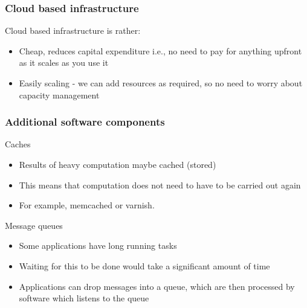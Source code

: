 \documentclass[a4paper]{article}
\theoremstyle{plain}
\theoremstyle{definition}
\theoremstyle{remark}
\begin{document}
\begin{flushleft}
\subsubsection{Cloud based infrastructure}
Cloud based infrastructure is rather:
\begin{itemize}
	\item Cheap, reduces capital expenditure i.e., no need to pay for anything upfront as it scales as you use it
	\item Easily scaling - we can add resources as required, so no need to worry about capacity management
\end{itemize}
\subsubsection{Additional software components}
Caches
\begin{itemize}
	\item Results of heavy computation maybe cached (stored)
	\item This means that computation does not need to have to be carried out again
	\item For example, memcached or varnish.
\end{itemize}
Message queues
\begin{itemize}
	\item Some applications have long running tasks
	\item Waiting for this to be done would take a significant amount of time
	\item Applications can drop messages into a queue, which are then processed by software which listens to the queue
\end{itemize}

\end{flushleft}
\end{document}
